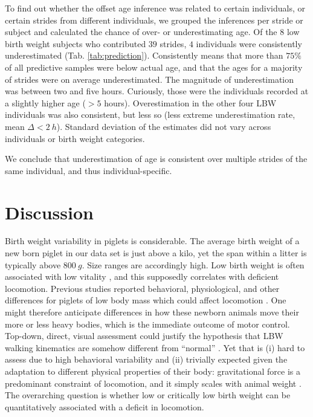 To find out whether the offset age inference was related to certain individuals, or certain strides from different individuals, we grouped the inferences per stride or subject and calculated the chance of over- or underestimating age.
Of the
\(8\)
low birth weight subjects who contributed
\(39\)
strides,
\(4\)
individuals were consistently underestimated (Tab. \ref{tab:prediction}).
Consistently means that more than \(75 \%\) of all predictive samples were below actual age, and that the ages for a majority of strides were on average underestimated.
The magnitude of underestimation was between two and five hours.
Curiously, those were the individuals recorded at a slightly higher age (\(> 5\) hours).
Overestimation in the other four LBW individuals was also consistent, but less so (less extreme underestimation rate, mean \(\Delta < 2\ h\)).
Standard deviation of the estimates did not vary across individuals or birth weight categories.

We conclude that underestimation of age is consistent over multiple strides of the same individual, and thus individual-specific.

\FloatBarrier
\clearpage
\section{Discussion}
\label{discussion_22}

Birth weight variability in piglets is considerable.
The average birth weight of a new born piglet in our data set is just above a kilo, yet the span within a litter is typically above \(800\ g\).
Size ranges are accordingly high.
Low birth weight is often associated with low vitality \citep{Baxter2008,Hales2013,Muns2013}, and this supposedly correlates with deficient locomotion.
Previous studies reported behavioral, physiological, and other differences for piglets of low body mass which could affect locomotion \citep{Quiniou2002,Muns2013,VandenHole2018b,Alvarenga2013,VandenHole2018,Roelofs2019}.
One might therefore anticipate differences in how these newborn animals move their more or less heavy bodies, which is the immediate outcome of motor control.
Top-down, direct, visual assessment could justify the hypothesis that LBW walking kinematics are somehow different from ``normal'' \citep{DEath2012}.
Yet that is (i) hard to assess due to high behavioral variability and (ii) trivially expected given the adaptation to different physical properties of their body: gravitational force is a predominant constraint of locomotion, and it simply scales with animal weight \citep{Aerts2023}.
The overarching question is whether low or critically low birth weight can be quantitatively associated with a deficit in locomotion.



